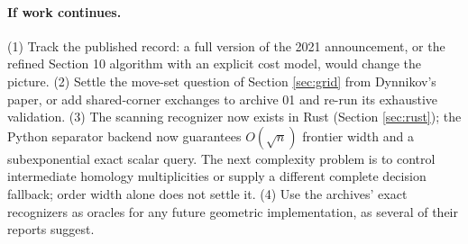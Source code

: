 \documentclass[11pt]{article}
\theoremstyle{remark}
\begin{document}
\paragraph{If work continues.}
(1) Track the published record: a full version of the 2021 announcement, or
the refined Section 10 algorithm with an explicit cost model, would change the
picture. (2) Settle the move-set question of Section \ref{sec:grid} from
Dynnikov's paper, or add shared-corner exchanges to archive 01 and re-run its
exhaustive validation. (3) The scanning recognizer now exists in Rust (Section \ref{sec:rust});
the Python separator backend now guarantees $O(\sqrt n)$ frontier width
and a subexponential exact scalar query. The next complexity problem is to
control intermediate homology multiplicities or supply a different complete
decision fallback; order width alone does not settle it.
(4) Use the archives' exact recognizers as oracles for any future geometric
implementation, as several of their reports suggest.
\end{document}
